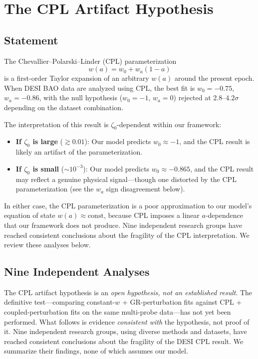 \section{The CPL Artifact Hypothesis}
\label{sec:2-CPL}

\subsection{Statement}
\label{sec:2-CPL-statement}

The Chevallier--Polarski--Linder (CPL) parameterization~\cite{ch2:Chevallier2001,ch2:Linder2003}
\begin{equation}
w(a) = w_0 + w_a(1 - a)
\label{eq:2-CPL}
\end{equation}
is a first-order Taylor expansion of an arbitrary $w(a)$ around the present epoch. When DESI BAO data are analyzed using CPL, the best fit is $w_0 = -0.75$, $w_a = -0.86$, with the null hypothesis ($w_0 = -1$, $w_a = 0$) rejected at $2.8$--$4.2\sigma$ depending on the dataset combination.

The interpretation of this result is $\zeta_0$-dependent within our framework:
\begin{itemize}
    \item \textbf{If $\zeta_0$ is large} ($\gtrsim 0.01$): Our model predicts $w_0 \approx -1$, and the CPL result is likely an artifact of the parameterization.
    \item \textbf{If $\zeta_0$ is small} ($\sim 10^{-3}$): Our model predicts $w_0 \approx -0.865$, and the CPL result may reflect a genuine physical signal---though one distorted by the CPL parameterization (see the $w_a$ sign disagreement below).
\end{itemize}

In either case, the CPL parameterization is a poor approximation to our model's equation of state $w(a) \approx \text{const}$, because CPL imposes a linear $a$-dependence that our framework does not produce. Nine independent research groups have reached consistent conclusions about the fragility of the CPL interpretation. We review these analyses below.

\subsection{Nine Independent Analyses}
\label{sec:2-CPL-seven}

The CPL artifact hypothesis is an \emph{open hypothesis, not an established result}. The definitive test---comparing constant-$w$ + GR-perturbation fits against CPL + coupled-perturbation fits on the same multi-probe data---has not yet been performed. What follows is evidence \emph{consistent with} the hypothesis, not proof of it. Nine independent research groups, using diverse methods and datasets, have reached consistent conclusions about the fragility of the DESI CPL result. We summarize their findings, none of which assumes our model.

